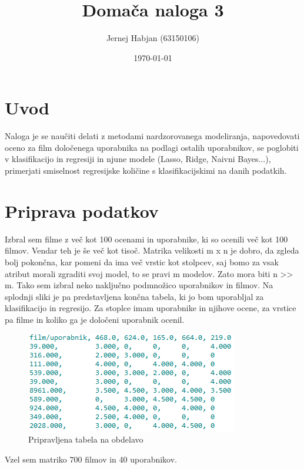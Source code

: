 \documentclass[a4paper,11pt]{article}
\title{Domača naloga 3}
\author{Jernej Habjan (63150106)}
\date{\today}
\begin{document}
	
	\maketitle
	\renewcommand\thesubsection{\Alph{subsection}}

	
	\section{Uvod}
	
	Naloga je se naučiti delati z metodami nardzorovanega modeliranja, napovedovati oceno za film določenega uporabnika na podlagi ostalih uporabnikov, se poglobiti v klasifikacijo in regresiji in njune modele (Lasso, Ridge, Naivni Bayes...), primerjati smiselnost regresijske količine s klasifikacijskimi na danih podatkih.

	
	\section{Priprava podatkov}
		Izbral sem filme z več kot 100 ocenami in uporabnike, ki so ocenili več kot 100 filmov. Vendar teh je še več kot tisoč. Matrika velikosti m x n je dobro, da zgleda bolj pokončna, kar pomeni da ima več vrstic kot stolpcev, saj bomo za vsak atribut morali zgraditi svoj model, to se pravi m modelov. Zato mora biti n >> m.
		Tako sem izbral neko naključno podmnožico uporabnikov in filmov.
		Na splodnji sliki je pa predstavljena končna tabela, ki jo bom uporabljal za klasifikacijo in regresijo.
		Za stoplce imam uporabnike in njihove ocene, za vrstice pa filme in koliko ga je določeni uporabnik ocenil.
		
		\begin{figure}[!htb]
		\begin{center}
		\includegraphics[scale=1.4]{slike/tabela.png}
		\caption{Pripravljena tabela na obdelavo}
		\label{slika1}
		\end{center}
		\end{figure}

		Vzel sem matriko 700 filmov in 40 uporabnikov.
\end{document}
